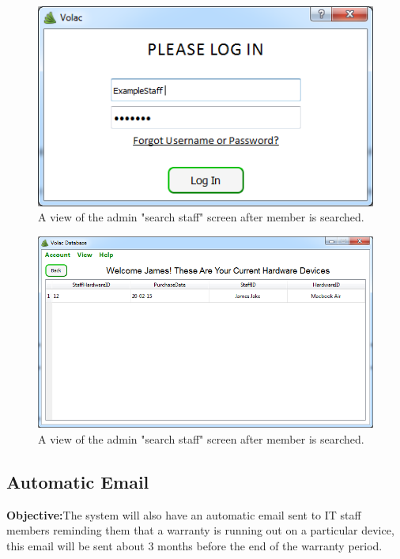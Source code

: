 \begin{figure}[H]
    \includegraphics[width=\textwidth]{./Evaluation/Images/login4.png}
    \caption{A view of the admin "search staff" screen after member is searched.} 
\end{figure}

\begin{figure}[H]
    \includegraphics[width=\textwidth]{./Evaluation/Images/login5.png}
    \caption{A view of the admin "search staff" screen after member is searched.} 
\end{figure}



\subsection{Automatic Email}

\textbf{Objective:}The system will also have an automatic email sent to IT staff members reminding them that a warranty is running out on a particular device, this email will be sent about 3 months before the end of the warranty period.

